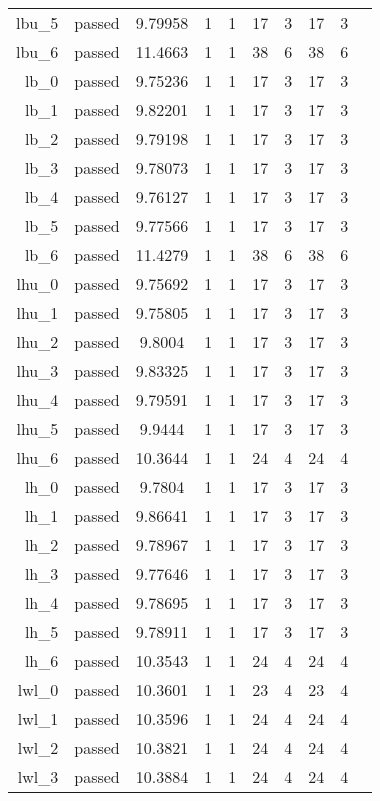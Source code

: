 \begin{longtable}{r|ccccccccc}
    lbu\_5 & passed & 9.79958 & 1 & 1 & 17 & 3 & 17 & 3 \\
    lbu\_6 & passed & 11.4663 & 1 & 1 & 38 & 6 & 38 & 6 \\
    lb\_0 & passed & 9.75236 & 1 & 1 & 17 & 3 & 17 & 3 \\
    lb\_1 & passed & 9.82201 & 1 & 1 & 17 & 3 & 17 & 3 \\
    lb\_2 & passed & 9.79198 & 1 & 1 & 17 & 3 & 17 & 3 \\
    lb\_3 & passed & 9.78073 & 1 & 1 & 17 & 3 & 17 & 3 \\
    lb\_4 & passed & 9.76127 & 1 & 1 & 17 & 3 & 17 & 3 \\
    lb\_5 & passed & 9.77566 & 1 & 1 & 17 & 3 & 17 & 3 \\
    lb\_6 & passed & 11.4279 & 1 & 1 & 38 & 6 & 38 & 6 \\
    lhu\_0 & passed & 9.75692 & 1 & 1 & 17 & 3 & 17 & 3 \\
    lhu\_1 & passed & 9.75805 & 1 & 1 & 17 & 3 & 17 & 3 \\
    lhu\_2 & passed & 9.8004 & 1 & 1 & 17 & 3 & 17 & 3 \\
    lhu\_3 & passed & 9.83325 & 1 & 1 & 17 & 3 & 17 & 3 \\
    lhu\_4 & passed & 9.79591 & 1 & 1 & 17 & 3 & 17 & 3 \\
    lhu\_5 & passed & 9.9444 & 1 & 1 & 17 & 3 & 17 & 3 \\
    lhu\_6 & passed & 10.3644 & 1 & 1 & 24 & 4 & 24 & 4 \\
    lh\_0 & passed & 9.7804 & 1 & 1 & 17 & 3 & 17 & 3 \\
    lh\_1 & passed & 9.86641 & 1 & 1 & 17 & 3 & 17 & 3 \\
    lh\_2 & passed & 9.78967 & 1 & 1 & 17 & 3 & 17 & 3 \\
    lh\_3 & passed & 9.77646 & 1 & 1 & 17 & 3 & 17 & 3 \\
    lh\_4 & passed & 9.78695 & 1 & 1 & 17 & 3 & 17 & 3 \\
    lh\_5 & passed & 9.78911 & 1 & 1 & 17 & 3 & 17 & 3 \\
    lh\_6 & passed & 10.3543 & 1 & 1 & 24 & 4 & 24 & 4 \\
    lwl\_0 & passed & 10.3601 & 1 & 1 & 23 & 4 & 23 & 4 \\
    lwl\_1 & passed & 10.3596 & 1 & 1 & 24 & 4 & 24 & 4 \\
    lwl\_2 & passed & 10.3821 & 1 & 1 & 24 & 4 & 24 & 4 \\
    lwl\_3 & passed & 10.3884 & 1 & 1 & 24 & 4 & 24 & 4 \\

\end{longtable}
